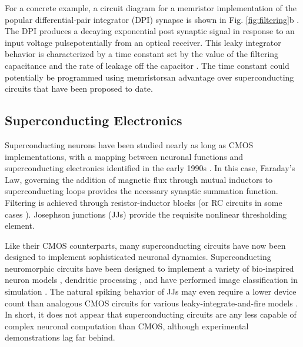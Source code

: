 \documentclass[twocolumn]{article}
\begin{document}
For a concrete example, a circuit diagram for a memristor implementation of the popular differential-pair integrator (DPI) synapse is shown in Fig. \ref{fig:filtering}b \cite{dalgaty2019hybrid}. The DPI produces a decaying exponential post synaptic signal in response to an input voltage pulse\textemdash potentially from an optical receiver. This leaky integrator behavior is characterized by a time constant set by the value of the filtering capacitance and the rate of leakage off the capacitor \cite{chicca2014neuromorphic}. The time constant could potentially be programmed using memristors\textemdash an advantage over superconducting circuits that have been proposed to date.

\subsection{Superconducting Electronics}
Superconducting neurons have been studied nearly as long as CMOS implementations, with a mapping between neuronal functions and superconducting electronics identified in the early 1990s \cite{hago1991, hiak1991}. In this case, Faraday's Law, governing the addition of magnetic flux through mutual inductors to superconducting loops provides the necessary synaptic summation function. Filtering is achieved through resistor-inductor blocks (or RC circuits in some cases \cite{crotty2010josephson}). Josephson junctions (JJs) provide the requisite nonlinear thresholding element.

Like their CMOS counterparts, many superconducting circuits have now been designed to implement sophisticated neuronal dynamics. Superconducting neuromorphic circuits have been designed to implement a variety of bio-inspired neuron models \cite{crotty2010josephson, toomey2019design, schneider2018tutorial}, dendritic processing \cite{shainline2019fluxonic}, and have performed image classification in simulation \cite{schneider2017energy}. The natural spiking behavior of JJs may even require a lower device count than analogous CMOS circuits for various leaky-integrate-and-fire models \cite{crotty2010josephson}. In short, it does not appear that superconducting circuits are any less capable of complex neuronal computation than CMOS, although experimental demonstrations lag far behind.
\end{document}

